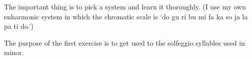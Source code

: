 \documentclass{sight}
\begin{document}
\pagebreak[3]\par
\vspace{5mm}\begin{samepage}The important thing is to pick a system and learn it thoroughly. (I use my own enharmonic system in which the chromatic scale is `do gu ri bu mi fa ka so ja la pa ti do.')\\
\end{samepage}
\pagebreak[4]


\pagebreak[3]\par
\vspace{5mm}\begin{samepage}The purpose of the first exercise is to get used to the solfeggio syllables used in minor.\\


\pagebreak[3]\par
{}%
\label{tune:170}%
{%
\parindent 0pt
\noindent
\ifx\preLilyPondExample \undefined
\else
  \expandafter\preLilyPondExample
\fi
\def\lilypondbook{}%

\ifx\postLilyPondExample \undefined
\else
  \expandafter\postLilyPondExample
\fi
}
\end{samepage}


\pagebreak[3]\par
\vspace{5mm}\begin{samepage}
%
\label{tune:171}%
{%
\parindent 0pt
\noindent
\ifx\preLilyPondExample \undefined
\else
  \expandafter\preLilyPondExample
\fi
\def\lilypondbook{}%

\ifx\postLilyPondExample \undefined
\else
  \expandafter\postLilyPondExample
\fi
}
\end{samepage}
\end{document}

